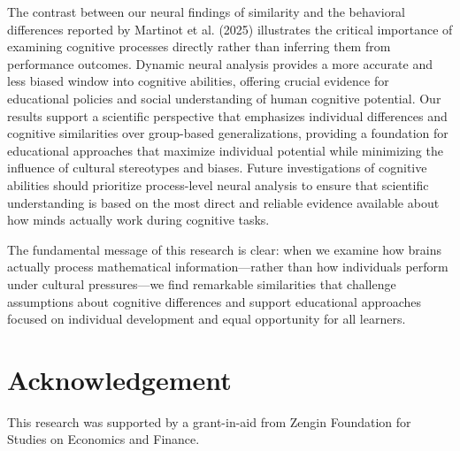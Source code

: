 \documentclass[12pt, a4paper]{article}
\begin{document}
The contrast between our neural findings of similarity and the behavioral differences reported by Martinot et al. (2025) illustrates the critical importance of examining cognitive processes directly rather than inferring them from performance outcomes. Dynamic neural analysis provides a more accurate and less biased window into cognitive abilities, offering crucial evidence for educational policies and social understanding of human cognitive potential.
Our results support a scientific perspective that emphasizes individual differences and cognitive similarities over group-based generalizations, providing a foundation for educational approaches that maximize individual potential while minimizing the influence of cultural stereotypes and biases. Future investigations of cognitive abilities should prioritize process-level neural analysis to ensure that scientific understanding is based on the most direct and reliable evidence available about how minds actually work during cognitive tasks.

The fundamental message of this research is clear: when we examine how brains actually process mathematical information—rather than how individuals perform under cultural pressures—we find remarkable similarities that challenge assumptions about cognitive differences and support educational approaches focused on individual development and equal opportunity for all learners.




\section*{Acknowledgement}
This research was supported by a grant-in-aid from Zengin Foundation for Studies on Economics and Finance.
\providecommand\NAT@force@numbers{}\NAT@force@numbers
\end{document}
